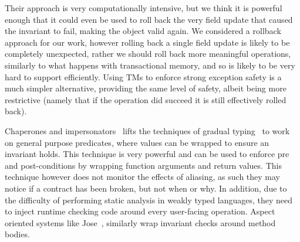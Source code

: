Their approach is very computationally intensive, but we think it is powerful enough that it could even be used to roll back the very field update that caused the invariant to fail, making the object valid again.
We considered a rollback approach for our work, however rolling back a single field update is likely to be completely unexpected, rather we should roll back more meaningful operations, similarly to what happens
with transactional memory, and so is likely to be very hard to support efficiently.
Using TMs to enforce strong exception safety is a much simpler alternative, providing the same level of safety, albeit being more restrictive (namely that if the operation did succeed it is still effectively rolled back).



Chaperones and impersonators~\cite{DBLP:conf/oopsla/StricklandTFF12} lifts the techniques of gradual typing~\cite{takikawa2015towards,DBLP:conf/oopsla/TakikawaSDTF12,DBLP:conf/popl/WrigstadNLOV10}
to work on general purpose predicates, where
values can be wrapped to ensure an invariant holds.
This technique is very powerful and can be used to enforce pre and post-conditions by wrapping function arguments and return values.
This technique however does not monitor the effects of aliasing, as such they may notice if a contract has been broken, but not when or why. In addition, due to the difficulty of performing static analysis in weakly typed languages, they need to inject runtime checking code around every user-facing operation.
Aspect oriented systems like Jose~\cite{feldman2006jose}, similarly wrap invariant checks around method bodies.

